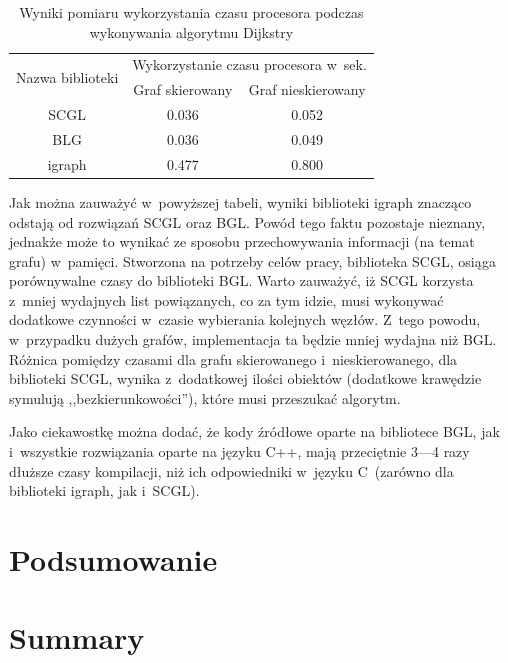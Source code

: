 \documentclass[a4paper,12pt,polish,oneside,openright]{thesis}
\begin{document}
\begin{table}[htb]
\caption{Wyniki pomiaru wykorzystania czasu procesora podczas wykonywania algorytmu Dijkstry}
\label{tab:dijkstra}
\centering
\begin{tabular}{ | c | c | c | }
	\hline
	\multirow{2}{*}{Nazwa biblioteki } & \multicolumn{2}{|c|}{Wykorzystanie czasu procesora w~sek.} \\
	\cline{2-3}
		& Graf skierowany & Graf nieskierowany \\
	\hline \hline
	SCGL    & 0.036 & 0.052 \\ \hline
	BLG     & 0.036 & 0.049 \\ \hline
	igraph  & 0.477 & 0.800 \\ \hline
\end{tabular}
\end{table}
Jak można zauważyć w~powyższej tabeli, wyniki biblioteki igraph znacząco odstają od rozwiązań SCGL oraz BGL.
Powód tego faktu pozostaje nieznany, jednakże może to wynikać ze sposobu przechowywania informacji (na temat grafu) w~pamięci.
Stworzona na potrzeby celów pracy, biblioteka SCGL, osiąga porównywalne czasy do biblioteki BGL.
Warto zauważyć, iż SCGL korzysta z~mniej wydajnych list powiązanych, co za tym idzie, musi wykonywać dodatkowe czynności w~czasie wybierania kolejnych węzłów.
Z~tego powodu, w~przypadku dużych grafów, implementacja ta będzie mniej wydajna niż BGL.
Różnica pomiędzy czasami dla grafu skierowanego i~nieskierowanego, dla biblioteki SCGL, wynika z~dodatkowej ilości obiektów (dodatkowe krawędzie symulują ,,bezkierunkowości''), które musi przeszukać algorytm.

Jako ciekawostkę można dodać, że kody źródłowe oparte na bibliotece BGL, jak i~wszystkie rozwiązania oparte na języku C++, mają przeciętnie 3---4 razy dłuższe czasy kompilacji, niż ich odpowiedniki w~języku C~(zarówno dla biblioteki igraph, jak i~SCGL).


\chapter*{Podsumowanie}
\chapter*{Summary}
\end{document}
